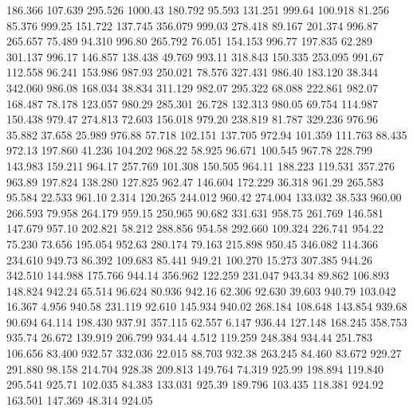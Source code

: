  186.366  107.639  295.526      1000.43
 180.792   95.593  131.251       999.64
 100.918   81.256   85.376       999.25
 151.722  137.745  356.079       999.03
 278.418   89.167  201.374       996.87
 265.657   75.489   94.310       996.80
 265.792   76.051  154.153       996.77
 197.835   62.289  301.137       996.17
 146.857  138.438   49.769       993.11
 318.843  150.335  253.095       991.67
 112.558   96.241  153.986       987.93
 250.021   78.576  327.431       986.40
 183.120   38.344  342.060       986.08
 168.034   38.834  311.129       982.07
 295.322   68.088  222.861       982.07
 168.487   78.178  123.057       980.29
 285.301   26.728  132.313       980.05
  69.754  114.987  150.438       979.47
 274.813   72.603  156.018       979.20
 238.819   81.787  329.236       976.96
  35.882   37.658   25.989       976.88
  57.718  102.151  137.705       972.94
 101.359  111.763   88.435       972.13
 197.860   41.236  104.202       968.22
  58.925   96.671  100.545       967.78
 228.799  143.983  159.211       964.17
 257.769  101.308  150.505       964.11
 188.223  119.531  357.276       963.89
 197.824  138.280  127.825       962.47
 146.604  172.229   36.318       961.29
 265.583   95.584   22.533       961.10
   2.314  120.265  244.012       960.42
 274.004  133.032   38.533       960.00
 266.593   79.958  264.179       959.15
 250.965   90.682  331.631       958.75
 261.769  146.581  147.679       957.10
 202.821   58.212  288.856       954.58
 292.660  109.324  226.741       954.22
  75.230   73.656  195.054       952.63
 280.174   79.163  215.898       950.45
 346.082  114.366  234.610       949.73
  86.392  109.683   85.441       949.21
 100.270   15.273  307.385       944.26
 342.510  144.988  175.766       944.14
 356.962  122.259  231.047       943.34
  89.862  106.893  148.824       942.24
  65.514   96.624   80.936       942.16
  62.306   92.630   39.603       940.79
 103.042   16.367    4.956       940.58
 231.119   92.610  145.934       940.02
 268.184  108.648  143.854       939.68
  90.694   64.114  198.430       937.91
 357.115   62.557    6.147       936.44
 127.148  168.245  358.753       935.74
  26.672  139.919  206.799       934.44
   4.512  119.259  248.384       934.44
 251.783  106.656   83.400       932.57
 332.036   22.015   88.703       932.38
 263.245   84.460   83.672       929.27
 291.880   98.158  214.704       928.38
 209.813  149.764   74.319       925.99
 198.894  119.840  295.541       925.71
 102.035   84.383  133.031       925.39
 189.796  103.435  118.381       924.92
 163.501  147.369   48.314       924.05
